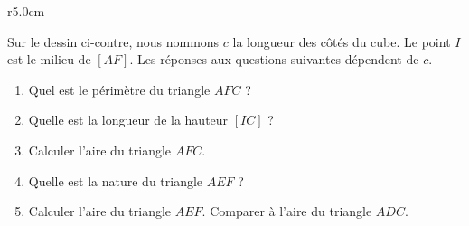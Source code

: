 
\begin{exercice}\label{exosmath-0115}

\begin{wrapfigure}{r}{5.0cm}
   \vspace{-0.5cm}        %
   \centering
   
\end{wrapfigure}

    Sur le dessin ci-contre, nous nommons \( c\) la longueur des côtés du cube. Le point \( I\) est le milieu de \( [AF]\). Les réponses aux questions suivantes dépendent de \( c\).

        \begin{enumerate}
            \item
                Quel est le périmètre du triangle \( AFC\) ?
            \item
                Quelle est la longueur de la hauteur \( [IC]\) ?
            \item
                Calculer l'aire du triangle \( AFC\).
            \item
                Quelle est la nature du triangle \( AEF\) ?
            \item
                Calculer l'aire du triangle \( AEF\). Comparer à l'aire du triangle \( ADC\).
        \end{enumerate}


\end{exercice}
